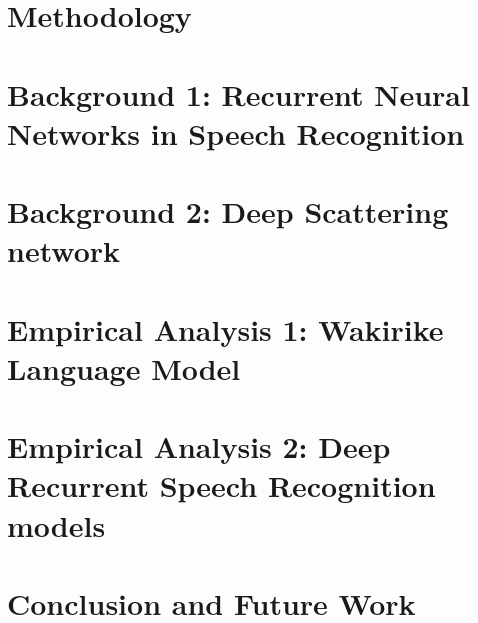 \documentclass[12pt,twoside]{report}
\begin{document}
\chapter{Methodology}\label{ch3Method}


\chapter{Background 1: Recurrent Neural Networks in Speech Recognition}\label{ch3RNN}


\chapter{Background 2: Deep Scattering network}\label{ch4DSN}


\chapter{Empirical Analysis 1: Wakirike Language Model}\label{ch6_wlm}


\chapter{Empirical Analysis 2: Deep Recurrent Speech Recognition models}\label{ch6_speech}


\chapter{Conclusion and Future Work}\label{ch8_future}

\chapter*{\appendix}
\label{app_haar}
\chapter*{\appendix}

\chapter*{\appendix}

\chapter*{\appendix}
\label{app4_tfcode}



\end{document}
